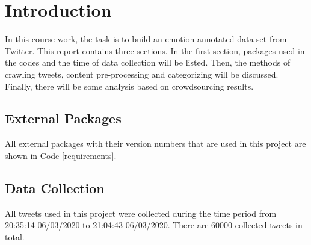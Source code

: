 \section{Introduction}

\renewcommand{\lstlistingname}{Code}

In this course work, the task is to build an emotion	annotated data set from Twitter. This report contains three sections. In the first section, packages used in the codes and the time of data collection will be listed. Then, the methods of crawling tweets, content pre-processing and categorizing will be discussed. Finally, there will be some analysis based on crowdsourcing results.

\subsection{External Packages}



All external packages with their version numbers that are used in this project are shown in Code \ref{requirements}.

\subsection{Data Collection}

All tweets used in this project were collected during the time period from 20:35:14 06/03/2020 to 21:04:43 06/03/2020. There are 60000 collected tweets in total.

